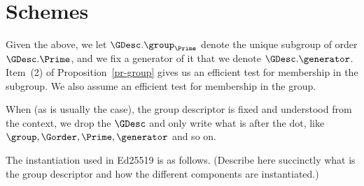 \section{Schemes} \label{sec-schemes}

Given the above, we let $\GDesc.\group_{\Prime}$ denote the unique subgroup of order $\GDesc.\Prime$, and we fix a generator of it that we denote $\GDesc.\generator$. Item~(2) of Proposition~\ref{pr-group} gives us an efficient test for membership in the subgroup. We also assume an efficient test for membership in the group.

When (as is usually the case), the group descriptor is fixed and understood from the context, we drop the $\GDesc$ and only write what is after the dot, like $\group,\Gorder,\Prime,\generator$ and so on.

The instantiation used in Ed25519 is as follows. (Describe here succinctly what is the group descriptor and how the different components are instantiated.)



